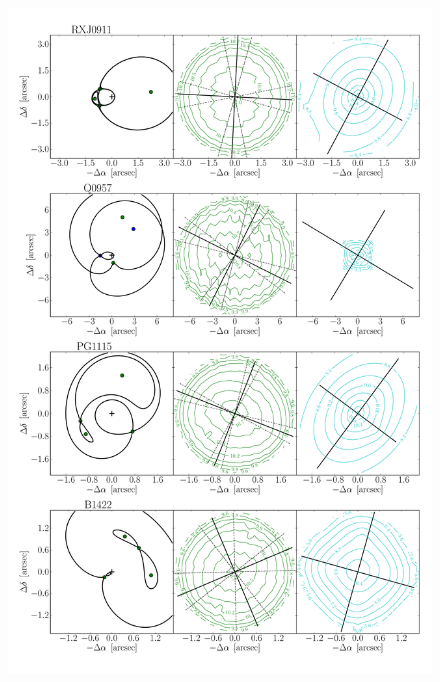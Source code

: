 \documentclass[useAMS,usenatbib]{mn2e}
\begin{document}
\begin{figure}
  \centering
  \includegraphics[width=.8\linewidth]{Figures/AllLenses32.pdf}
  \caption[width=.65\linewidth]{}
  \label{fig:lensreconstruction2}
\end{figure}
\end{document}
